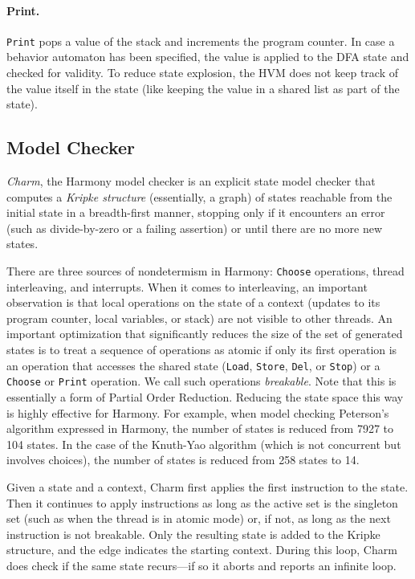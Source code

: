 \documentclass[twocolumn]{article}
\begin{document}
\paragraph{Print.}  \texttt{Print} pops a value of the stack and increments
the program counter.  In case a behavior automaton has been specified, the
value is applied to the DFA state and checked for validity.
To reduce state explosion, the HVM does not keep track of the value itself
in the state (like keeping the value in a shared list as part of the state).

\subsection{Model Checker}

\emph{Charm}, the Harmony model checker is an explicit state model
checker that computes a \emph{Kripke structure} (essentially, a graph)
of states reachable
from the initial state in a breadth-first manner, stopping only if
it encounters an error (such as divide-by-zero or a failing assertion)
or until there are no more new states.

There are three sources of nondetermism in Harmony: \texttt{Choose}
operations, thread interleaving, and interrupts.
When it comes to interleaving, an important observation is that
local operations on the state of a context (updates to its program
counter, local variables, or stack) are not visible to other threads.
An important optimization that significantly
reduces the size of the set of generated states is to treat a
sequence of operations as atomic if only its first operation is an
operation that accesses the shared state (\texttt{Load}, \texttt{Store},
\texttt{Del}, or \texttt{Stop}) or a \texttt{Choose} or \texttt{Print}
operation.  We call such operations \emph{breakable}.
Note that this is essentially a form of Partial Order Reduction.
Reducing the state space this way is highly effective for Harmony.
For example, when model checking Peterson's algorithm expressed in
Harmony, the number of states is reduced from 7927 to 104 states.
In the case of the Knuth-Yao algorithm (which is not concurrent but
involves choices), the number of states is reduced from 258 states
to 14.

Given a state and a context, Charm first applies the first instruction
to the state.  Then it continues to apply instructions as long as
the active set is the singleton set (such as when the thread is in
atomic mode) or, if not, as long as the next instruction is not
breakable.  Only the resulting state is added to the Kripke structure,
and the edge indicates the starting context.  During this loop, Charm
does check if the same state recurs---if so it aborts
and reports an infinite loop.
\end{document}
